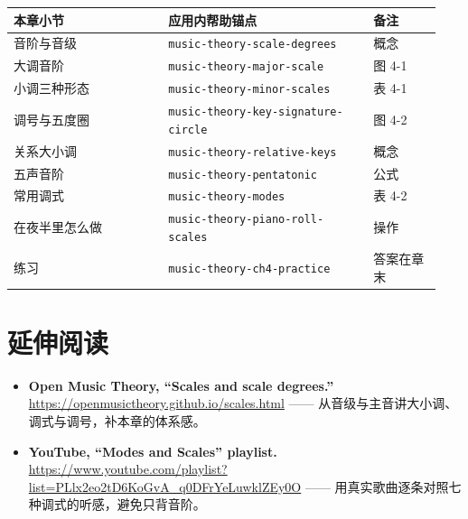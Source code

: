 \begin{center}
\footnotesize
\setlength{\tabcolsep}{3pt}
\begin{longtable}{p{0.34\linewidth}p{0.45\linewidth}p{0.15\linewidth}}
\toprule
本章小节 & 应用内帮助锚点 & 备注 \\
\midrule
\endhead
音阶与音级 & \texttt{music-theory-scale-degrees} & 概念 \\
大调音阶 & \texttt{music-theory-major-scale} & 图 4-1 \\
小调三种形态 & \texttt{music-theory-minor-scales} & 表 4-1 \\
调号与五度圈 & \texttt{music-theory-key-signature-circle} & 图 4-2 \\
关系大小调 & \texttt{music-theory-relative-keys} & 概念 \\
五声音阶 & \texttt{music-theory-pentatonic} & 公式 \\
常用调式 & \texttt{music-theory-modes} & 表 4-2 \\
在夜半里怎么做 & \texttt{music-theory-piano-roll-scales} & 操作 \\
练习 & \texttt{music-theory-ch4-practice} & 答案在章末 \\
\bottomrule
\end{longtable}
\end{center}

\section*{延伸阅读}
\begin{itemize}
  \item \textbf{Open Music Theory, “Scales and scale degrees.”} \url{https://openmusictheory.github.io/scales.html} —— 从音级与主音讲大小调、调式与调号，补本章的体系感。
  \item \textbf{YouTube, “Modes and Scales” playlist.} \url{https://www.youtube.com/playlist?list=PLlx2eo2tD6KoGvA_q0DFrYeLuwklZEy0O} —— 用真实歌曲逐条对照七种调式的听感，避免只背音阶。
\end{itemize}

